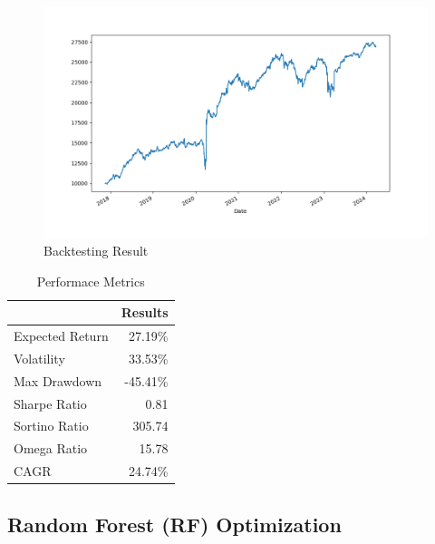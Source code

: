  \begin{figure}[H]
   \centering
   \includegraphics[width=1\linewidth]{images/LPM/backtest.png}
   \caption{Backtesting Result}
   \label{fig:network_architecture1}
 \end{figure}

 \begin{table}[H]

    \centering %
    \label{tab:performance_metrics}
    
    \caption{Performace Metrics}
    \vspace{5mm} %

\begin{tabular}{lr}
\toprule
 & Results \\
\midrule
Expected Return & 27.19\% \\
Volatility & 33.53\% \\
Max Drawdown & -45.41\% \\
Sharpe Ratio & 0.81 \\
Sortino Ratio & 305.74 \\
Omega Ratio & 15.78 \\
CAGR & 24.74\% \\
\bottomrule
\end{tabular}
\end{table}

\subsection{Random Forest (RF) Optimization}


